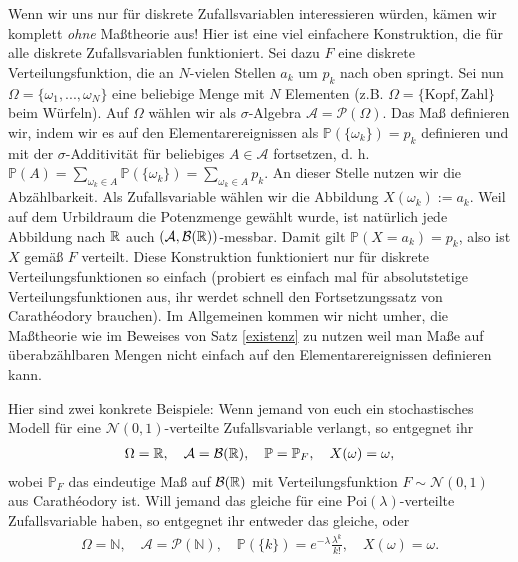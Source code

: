 \begin{bem}
	Wenn wir uns nur f\"ur diskrete Zufallsvariablen interessieren w\"urden, k\"amen wir komplett \textit{ohne} Maßtheorie aus! Hier ist eine viel einfachere Konstruktion, die f\"ur alle diskrete Zufallsvariablen funktioniert. Sei dazu $F$ eine diskrete Verteilungsfunktion, die an $N$-vielen Stellen $a_k$ um $p_k$ nach oben springt. Sei nun $\Omega=\{\omega_1,...,\omega_N\}$ eine beliebige Menge mit $N$ Elementen (z.B. $\Omega=\{\text{Kopf}, \text{Zahl}\}$ beim W\"urfeln). Auf $\Omega$ w\"ahlen wir als $\sigma$-Algebra $\mathcal A=\mathcal P(\Omega)$. Das Ma\ss{} definieren wir, indem wir es auf den Elementarereignissen als $\mathbb P(\{\omega_k\})=p_k$ definieren und mit der $\sigma$-Additivit\"at f\"ur beliebiges $A\in \mathcal A$ fortsetzen, d. h. $\mathbb P(A)=\sum_{\omega_k\in A} \mathbb P(\{\omega_k\})=\sum_{\omega_k\in A}p_k.$ An dieser Stelle nutzen wir die Abz\"ahlbarkeit. Als Zufallsvariable w\"ahlen wir die Abbildung $X(\omega_k):=a_k$. Weil auf dem Urbildraum die Potenzmenge gew\"ahlt wurde, ist nat\"urlich jede Abbildung nach $\mathbb{R}$ auch $(\mathcal A, \mathcal B(\mathbb{R}))$-messbar. Damit gilt $\mathbb{P}(X = a_k) = p_k$, also ist $X$ gem\"a\ss{} $F$ verteilt. Diese Konstruktion funktioniert nur f\"ur diskrete Verteilungsfunktionen so einfach (probiert es einfach mal f\"ur absolutstetige Verteilungsfunktionen aus, ihr werdet schnell den Fortsetzungssatz von Carath\'eodory brauchen). Im Allgemeinen kommen wir nicht umher, die Ma\ss theorie wie im Beweises von Satz \ref{existenz} zu nutzen weil man Ma\ss e auf \"uberabz\"ahlbaren Mengen nicht einfach auf den Elementarereignissen definieren kann.
\end{bem}
Hier sind zwei konkrete Beispiele: Wenn jemand von euch ein stochastisches Modell f\"ur eine $\mathcal N(0,1)$-verteilte Zufallsvariable verlangt, so entgegnet ihr
\begin{align*}
	\Omega=\mathbb{R},\quad \mathcal A=\mathcal B(\mathbb{R}),\quad \mathbb P=\mathbb P_F,\quad X(\omega)=\omega,
\end{align*}
wobei $\mathbb P_F$ das eindeutige Ma\ss{} auf $\mathcal B(\mathbb{R})$ mit Verteilungsfunktion $F\sim \mathcal N(0,1)$ aus Carath\'eodory ist. Will jemand das gleiche f\"ur eine $\text{Poi}(\lambda)$-verteilte Zufallsvariable haben, so entgegnet ihr entweder das gleiche, oder 
\begin{align*}
	\Omega=\mathbb N,\quad \mathcal A=\mathcal P(\mathbb N),\quad \mathbb P(\{k\})=e^{-\lambda} \frac{\lambda^k}{k!},\quad X(\omega)=\omega.
\end{align*}
